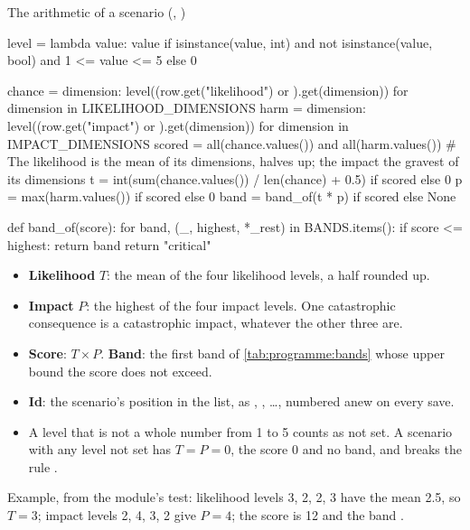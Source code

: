 \begin{codebox}{The arithmetic of a scenario (, )}
\begin{codeblock}
level = lambda value: value if isinstance(value, int) and not isinstance(value, bool) and 1 <= value <= 5 else 0

chance = {dimension: level((row.get("likelihood") or {}).get(dimension)) for dimension in LIKELIHOOD_DIMENSIONS}
harm = {dimension: level((row.get("impact") or {}).get(dimension)) for dimension in IMPACT_DIMENSIONS}
scored = all(chance.values()) and all(harm.values())
# The likelihood is the mean of its dimensions, halves up; the impact the gravest of its dimensions
t = int(sum(chance.values()) / len(chance) + 0.5) if scored else 0
p = max(harm.values()) if scored else 0
band = band_of(t * p) if scored else None
\end{codeblock}

\begin{codeblock}
def band_of(score):
    for band, (_, highest, *_rest) in BANDS.items():
        if score <= highest:
            return band
    return "critical"
\end{codeblock}

\begin{itemize}
  \item \textbf{Likelihood} $T$: the mean of the four likelihood levels, a half rounded up.
  \item \textbf{Impact} $P$: the highest of the four impact levels. One catastrophic
        consequence is a catastrophic impact, whatever the other three are.
  \item \textbf{Score}: $T \times P$. \textbf{Band}: the first band of
        \cref{tab:programme:bands} whose upper bound the score does not exceed.
  \item \textbf{Id}: the scenario's position in the list, as , , …,
        numbered anew on every save.
  \item A level that is not a whole number from 1 to 5 counts as not set. A scenario with
        any level not set has $T = P = 0$, the score 0 and no band, and breaks the rule
        .
\end{itemize}

Example, from the module's test: likelihood levels 3, 2, 2, 3 have the mean 2.5, so $T = 3$;
impact levels 2, 4, 3, 2 give $P = 4$; the score is 12 and the band .
\end{codebox}

